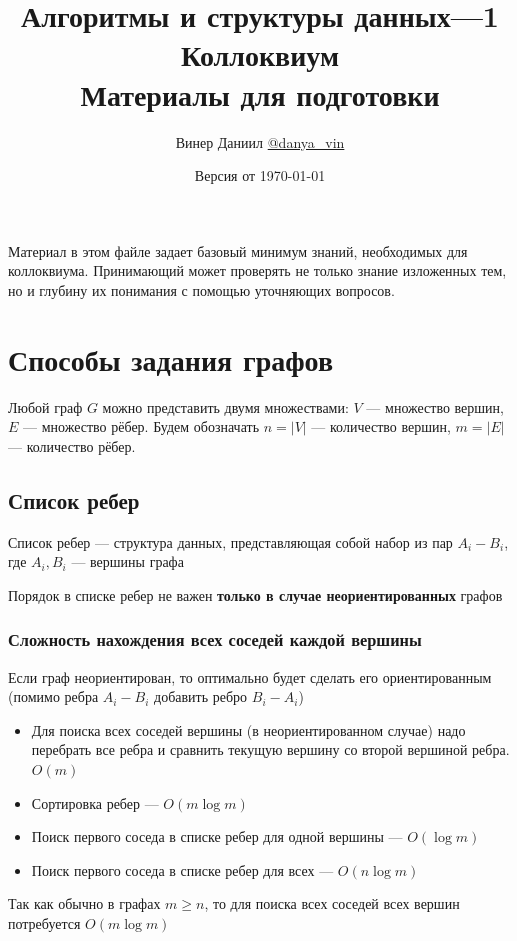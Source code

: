 \documentclass[a4paper]{article}
\let\defaulttableofcontents\tableofcontents
\renewcommand{\tableofcontents}{%
  \begingroup
  \setlength{\parskip}{0pt}%
  \defaulttableofcontents
  \endgroup
}
\begin{document}
\title{\LARGE{Алгоритмы и структуры данных—1}\\ Коллоквиум\\ Материалы для подготовки}
\author{Винер Даниил \href{https://t.me/danya_vin}{@danya\_vin}}
\date{Версия от \today}
\maketitle
Материал в этом файле задает базовый минимум знаний, необходимых для коллоквиума. Принимающий может проверять не только знание изложенных тем, но и глубину их понимания с помощью уточняющих вопросов.
\tableofcontents
\newpage
\section{Способы задания графов}
Любой граф $G$ можно представить двумя множествами: $V$ — множество вершин, $E$ — множество рёбер. Будем обозначать $n=|V|$ — количество вершин, $m=|E|$ — количество рёбер.

\subsection{Список ребер}
 Список ребер — структура данных, представляющая собой набор из пар $A_i-B_i$, где $A_i,B_i$ — вершины графа

Порядок в списке ребер не важен \textbf{только в случае неориентированных} графов

\subsubsection*{Сложность нахождения всех соседей каждой вершины}
Если граф неориентирован, то оптимально будет сделать его ориентированным (помимо ребра $A_i-B_i$ добавить ребро $B_i-A_i$)

\begin{itemize}
    \item Для поиска всех соседей вершины (в неориентированном случае) надо перебрать все ребра и сравнить текущую вершину со второй вершиной ребра. $O(m)$
    \item Сортировка ребер — $O(m\log m)$
    \item Поиск первого соседа в списке ребер для одной вершины — $O(\log m)$
    \item Поиск первого соседа в списке ребер для всех — $O(n\log m)$
\end{itemize}

Так как обычно в графах $m\geqslant n$, то для поиска всех соседей всех вершин потребуется $O(m\log m)$
\end{document}
